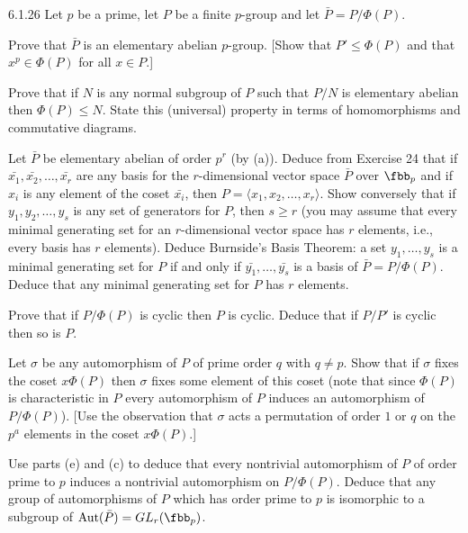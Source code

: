 \begin{exercise}{6.1.26}
    Let $p$ be a prime, let $P$ be a finite $p$-group and let $\bar{P} = P/\Phi(P)$.
    \begin{subexercises}
        \item Prove that $\bar{P}$ is an elementary abelian $p$-group.
        [Show that $P' \leq \Phi(P)$ and that $x^p \in \Phi(P)$ for all $x \in P$.]
        \item Prove that if $N$ is any normal subgroup of $P$ such that $P/N$ is elementary abelian then $\Phi(P) \leq N$.
        State this (universal) property in terms of homomorphisms and commutative diagrams.
        \item Let $\bar{P}$ be elementary abelian of order $p^r$ (by (a)).
        Deduce from Exercise 24 that if $\bar{x_1}, \bar{x_2}, \ldots, \bar{x_r}$ are any basis for the $r$-dimensional vector space $\bar{P}$ over $\fbb_p$ and if $x_i$ is any element of the coset $\bar{x_i}$, then $P = \langle x_1, x_2, \ldots, x_r \rangle$.
        Show conversely that if $y_1, y_2, \ldots, y_s$ is any set of generators for $P$, then $s \geq r$ (you may assume that every minimal generating set for an $r$-dimensional vector space has $r$ elements, i.e., every basis has $r$ elements).
        Deduce Burnside's Basis Theorem: a set $y_1, \ldots, y_s$ is a minimal generating set for $P$ if and only if $\bar{y_1}, \ldots, \bar{y_s}$ is a basis of $\bar{P} = P/\Phi(P)$.
        Deduce that any minimal generating set for $P$ has $r$ elements.
        \item Prove that if $P/\Phi(P)$ is cyclic then $P$ is cyclic.
        Deduce that if $P/P'$ is cyclic then so is $P$.
        \item Let $\sigma$ be any automorphism of $P$ of prime order $q$ with $q \neq p$.
        Show that if $\sigma$ fixes the coset $x\Phi(P)$ then $\sigma$ fixes some element of this coset (note that since $\Phi(P)$ is characteristic in $P$ every automorphism of $P$ induces an automorphism of $P/\Phi(P)$).
        [Use the observation that $\sigma$ acts a permutation of order $1$ or $q$ on the $p^a$ elements in the coset $x\Phi(P)$.]
        \item Use parts (e) and (c) to deduce that every nontrivial automorphism of $P$ of order prime to $p$ induces a nontrivial automorphism on $P/\Phi(P)$.
        Deduce that any group of automorphisms of $P$ which has order prime to $p$ is isomorphic to a subgroup of $\mathrm{Aut}(\bar{P}) = GL_r(\fbb_p)$.
    \end{subexercises}
\end{exercise}

